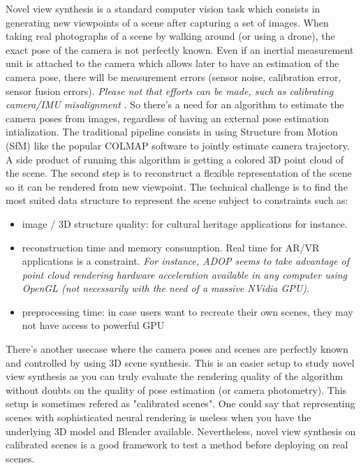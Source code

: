 Novel view synthesis is a standard computer vision task which consists in generating new viewpoints of a scene after capturing a set of images.
When taking real photographs of a scene by walking around (or using a drone), the exact pose of the camera is not perfectly known. Even if an inertial measurement unit is attached to the camera which allows later to have an estimation of the camera pose, there will be measurement errors (sensor noise, calibration error, sensor fusion errors). \textit{Please not that efforts can be made, such as calibrating camera/IMU misalignment} \cite*{karpenko2011gyrostab}. 
So there's a need for an algorithm to estimate the camera poses from images, regardless of having an external pose estimation intialization.
The traditional pipeline consists in using Structure from Motion (SfM) like the popular COLMAP software \cite{schoenberger2016sfm} to jointly estimate camera trajectory. A side product of running this algorithm is getting a colored 3D point cloud of the scene. 
The second step is to reconstruct a flexible representation of the scene so it can be rendered from new viewpoint. The technical challenge is to find the most suited data structure to represent the scene subject to constraints such as: 
\begin{itemize}
    \item image / 3D structure quality: for cultural heritage applications for instance. 
    \item reconstruction time and memory consumption. Real time for AR/VR applications is a constraint. \textit{For instance, ADOP seems to take advantage of point cloud rendering hardware acceleration available in any computer using OpenGL (not necessarily with the need of a massive NVidia GPU)}. 
    \item preprocessing time: in case users want to recreate their own scenes, they may not have access to powerful GPU 
\end{itemize}
There's another usecase where the camera poses and scenes are perfectly known and controlled by using 3D scene synthesis. This is an easier setup to study novel view synthesis as you can truly evaluate the rendering quality of the algorithm without doubts on the quality of pose estimation (or camera photometry). This setup is sometimes refered as "calibrated scenes". One could say that representing scenes with sophisticated neural rendering is useless when you have the underlying 3D model and Blender available. Nevertheless, novel view synthesis on calibrated scenes is a good framework to test a method before deploying on real scenes.

